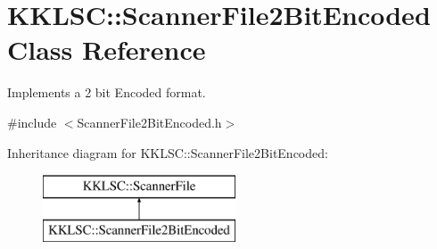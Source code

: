 \hypertarget{class_k_k_l_s_c_1_1_scanner_file2_bit_encoded}{}\section{K\+K\+L\+SC\+:\+:Scanner\+File2\+Bit\+Encoded Class Reference}
\label{class_k_k_l_s_c_1_1_scanner_file2_bit_encoded}


Implements a 2 bit Encoded format.  




{\ttfamily \#include $<$Scanner\+File2\+Bit\+Encoded.\+h$>$}

Inheritance diagram for K\+K\+L\+SC\+:\+:Scanner\+File2\+Bit\+Encoded\+:\begin{figure}[H]
\begin{center}
\leavevmode
\includegraphics[height=2.000000cm]{class_k_k_l_s_c_1_1_scanner_file2_bit_encoded}
\end{center}
\end{figure}
